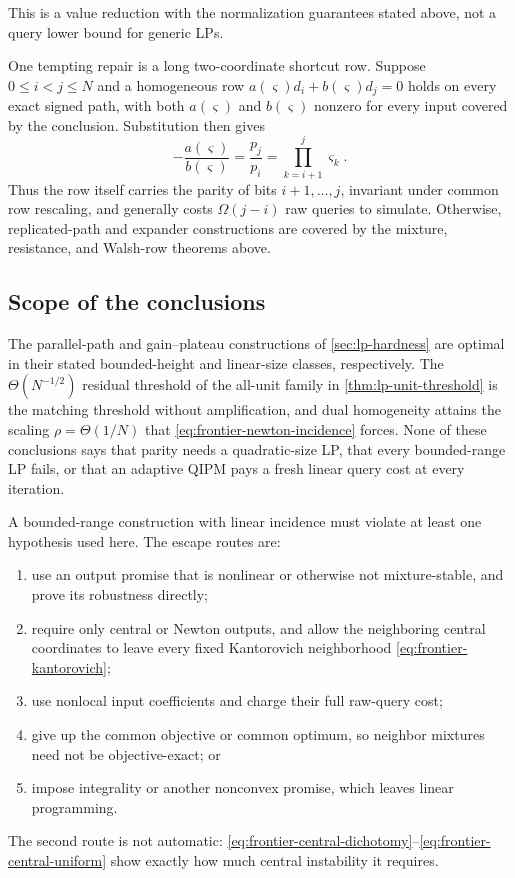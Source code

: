 This is a value reduction with the normalization guarantees stated above,
not a query lower bound for generic LPs.

One tempting repair is a long two-coordinate shortcut row.  Suppose
\(0\leq i<j\leq N\) and a homogeneous row
\(a(\varsigma)d_i+b(\varsigma)d_j=0\) holds on every exact signed path,
with both \(a(\varsigma)\) and \(b(\varsigma)\) nonzero for every input
covered by the conclusion.  Substitution then gives
\begin{equation}
 -\frac{a(\varsigma)}{b(\varsigma)}
 =\frac{p_j}{p_i}=\prod_{k=i+1}^j\varsigma_k.
 \label{eq:frontier-shortcut-parity}
\end{equation}
Thus the row itself carries the parity of bits \(i+1,\ldots,j\),
invariant under common row rescaling, and generally costs
\(\Omega(j-i)\) raw queries to simulate.  Otherwise, replicated-path and
expander constructions are covered by the mixture, resistance, and
Walsh-row theorems above.

\subsection{Scope of the conclusions}
\label{sec:frontier-synthesis}

The parallel-path and gain--plateau constructions of \cref{sec:lp-hardness}
are optimal in their stated bounded-height and linear-size classes,
respectively.  The \(\Theta(N^{-1/2})\) residual threshold of
the all-unit family in \cref{thm:lp-unit-threshold} is the matching
threshold without amplification, and dual homogeneity attains the scaling
\(\rho=\Theta(1/N)\) that \eqref{eq:frontier-newton-incidence} forces.
None of these conclusions says that parity needs a quadratic-size LP, that
every bounded-range LP fails, or that an adaptive QIPM pays a fresh linear
query cost at every iteration.

A bounded-range construction with linear incidence must violate at least
one hypothesis used here.  The escape routes are:
\begin{enumerate}[label=(\roman*)]
 \item use an output promise that is nonlinear or otherwise not
       mixture-stable, and prove its robustness directly;
 \item require only central or Newton outputs, and allow the neighboring
       central coordinates to leave every fixed Kantorovich neighborhood
       \eqref{eq:frontier-kantorovich};
 \item use nonlocal input coefficients and charge their full raw-query
       cost;
 \item give up the common objective or common optimum, so neighbor
       mixtures need not be objective-exact; or
 \item impose integrality or another nonconvex promise, which leaves linear
       programming.
\end{enumerate}
The second route is not automatic:
\eqref{eq:frontier-central-dichotomy}--\eqref{eq:frontier-central-uniform}
show exactly how much central instability it requires.

